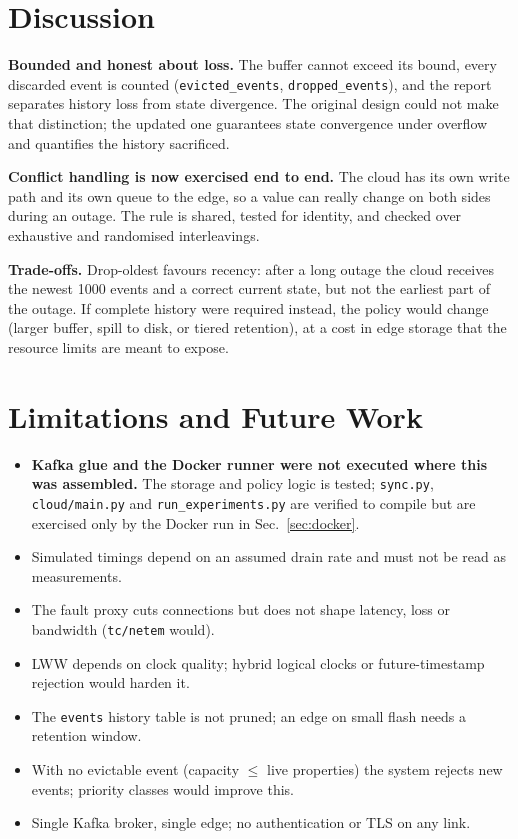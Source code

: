 \documentclass[11pt,a4paper]{article}
\begin{document}
\section{Discussion}
\textbf{Bounded and honest about loss.} The buffer cannot exceed its bound, every discarded event is counted
(\texttt{evicted\_events}, \texttt{dropped\_events}), and the report separates history loss from state
divergence. The original design could not make that distinction; the updated one guarantees state
convergence under overflow and quantifies the history sacrificed.

\textbf{Conflict handling is now exercised end to end.} The cloud has its own write path and its own
queue to the edge, so a value can really change on both sides during an outage. The rule is shared, tested for
identity, and checked over exhaustive and randomised interleavings.

\textbf{Trade-offs.} Drop-oldest favours recency: after a long outage the cloud receives the newest 1000 events and
a correct current state, but not the earliest part of the outage. If complete history were required instead,
the policy would change (larger buffer, spill to disk, or tiered retention), at a cost in edge storage that the
resource limits are meant to expose.

\section{Limitations and Future Work}\label{sec:limits}
\begin{itemize}[nosep]
\item \textbf{Kafka glue and the Docker runner were not executed where this was assembled.} The storage and
policy logic is tested; \texttt{sync.py}, \texttt{cloud/main.py} and \texttt{run\_experiments.py} are
verified to compile but are exercised only by the Docker run in Sec.~\ref{sec:docker}.
\item Simulated timings depend on an assumed drain rate and must not be read as measurements.
\item The fault proxy cuts connections but does not shape latency, loss or bandwidth (\texttt{tc/netem} would).
\item LWW depends on clock quality; hybrid logical clocks or future-timestamp rejection would harden it.
\item The \texttt{events} history table is not pruned; an edge on small flash needs a retention window.
\item With no evictable event (capacity $\le$ live properties) the system rejects new events; priority classes would
improve this.
\item Single Kafka broker, single edge; no authentication or TLS on any link.
\end{itemize}
\end{document}
